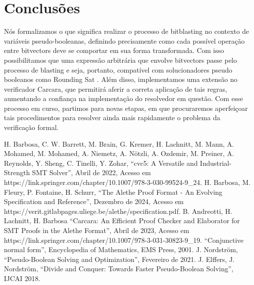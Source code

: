 \documentclass[conference]{IEEEtran}
\begin{document}
\section*{Conclusões}
Nós formalizamos o que significa realizar o processo de bitblasting no contexto de variáveis
pseudo-booleanas, definindo precisamente como cada possível operação entre bitvectors deve se
comportar em sua forma transformada. Com isso possibilitamos que uma expressão arbitrária que
envolve bitvectors passe pelo processo de blasting e seja, portanto, compatível com solucionadores
pseudo booleanos como Rounding Sat \cite{RoundingSat}. Além disso, implementamos uma extensão no
verificador Carcara, que permitirá aferir a correta aplicação de tais regras, aumentando a confiança
na implementação do resolvedor em questão. Com esse processo em curso, partimos para novas etapas,
em que procuraremos aperfeiçoar tais procedimentos para resolver ainda mais rapidamente o problema
da verificação formal.


\begin{thebibliography}{00}
              H. Barbosa, C. W. Barrett, M. Brain, G. Kremer, H. Lachnitt, M. Mann, A. Mohamed, M. Mohamed, A. Niemetz, A. Nötzli, A. Ozdemir, M. Preiner, A. Reynolds, Y. Sheng, C. Tinelli, Y. Zohar, ``cvc5: A Versatile and Industrial-Strength SMT Solver'', Abril de 2022, Acesso em https://link.springer.com/chapter/10.1007/978-3-030-99524-9\_24.
            H. Barbosa, M. Fleury, P. Fontaine, H. Schurr, ``The Alethe Proof Format - An Evolving Specification and Reference'', Dezembro de 2024, Acesso em https://verit.gitlabpages.uliege.be/alethe/specification.pdf.
           B. Andreotti, H. Lachnitt, H. Barbosa ``Carcara: An Efficient Proof Checker and Elaborator for SMT Proofs in the Alethe Format'', Abril de 2023, Acesso em https://link.springer.com/chapter/10.1007/978-3-031-30823-9\_19.
               ``Conjunctive normal form'', Encyclopedia of Mathematics, EMS Press, 2001.
           J. Nordström, ``Pseudo-Boolean Solving and Optimization'', Fevereiro de 2021.
       J. Elffers, J. Nordström, ``Divide and Conquer: Towards Faster Pseudo-Boolean Solving'', IJCAI 2018.
\end{thebibliography}

\newpage
\onecolumn
\appendix
\end{document}
